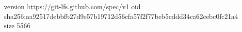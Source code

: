 version https://git-lfs.github.com/spec/v1
oid sha256:aa92517debbfb27d9e57b19712d56cfa57f2f77beb5cddd34ca62cebc0fc21a4
size 5566
